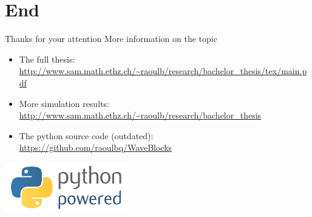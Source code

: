 \documentclass{beamer}
\newcommand{\burl}[1]{\footnotesize{\url{#1}}}
\begin{document}
\section{End}


\begin{frame}{Thanks for your attention}
  More information on the topic
  \begin{itemize}
  \item The full thesis:\\
    {\burl{http://www.sam.math.ethz.ch/~raoulb/research/bachelor_thesis/tex/main.pdf}}
  \item More simulation results:\\
    {\burl{http://www.sam.math.ethz.ch/~raoulb/research/bachelor_thesis}}
  \item The python source code (outdated):\\
    {\burl{https://github.com/raoulbq/WaveBlocks}}
  \end{itemize}
  \begin{center}
    \includegraphics[scale=1.0]{./python-powered-w.pdf}
  \end{center}
\end{frame}
\end{document}
